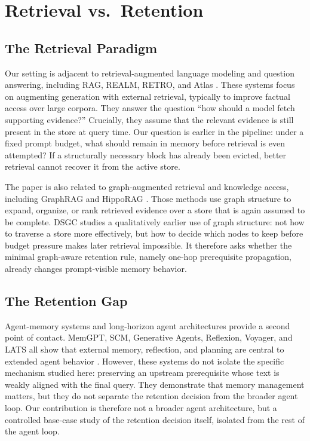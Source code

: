\documentclass[10pt]{article}
\begin{document}
\section{Retrieval vs.\ Retention}

\subsection{The Retrieval Paradigm}

Our setting is adjacent to retrieval-augmented language modeling and question answering, including RAG, REALM, RETRO, and Atlas \cite{rag2020,realm2020,retro2021,atlas2022}. These systems focus on augmenting generation with external retrieval, typically to improve factual access over large corpora. They answer the question ``how should a model fetch supporting evidence?'' Crucially, they assume that the relevant evidence is still present in the store at query time. Our question is earlier in the pipeline: under a fixed prompt budget, what should remain in memory before retrieval is even attempted? If a structurally necessary block has already been evicted, better retrieval cannot recover it from the active store.

The paper is also related to graph-augmented retrieval and knowledge access, including GraphRAG and HippoRAG \cite{graphrag2024,hipporag2024}. Those methods use graph structure to expand, organize, or rank retrieved evidence over a store that is again assumed to be complete. DSGC studies a qualitatively earlier use of graph structure: not how to traverse a store more effectively, but how to decide which nodes to keep before budget pressure makes later retrieval impossible. It therefore asks whether the minimal graph-aware retention rule, namely one-hop prerequisite propagation, already changes prompt-visible memory behavior.

\subsection{The Retention Gap}

Agent-memory systems and long-horizon agent architectures provide a second point of contact. MemGPT, SCM, Generative Agents, Reflexion, Voyager, and LATS all show that external memory, reflection, and planning are central to extended agent behavior \cite{memgpt2023,scm2023,generative_agents2023,reflexion2023,voyager2023,lats2024}. However, these systems do not isolate the specific mechanism studied here: preserving an upstream prerequisite whose text is weakly aligned with the final query. They demonstrate that memory management matters, but they do not separate the retention decision from the broader agent loop. Our contribution is therefore not a broader agent architecture, but a controlled base-case study of the retention decision itself, isolated from the rest of the agent loop.
\end{document}

